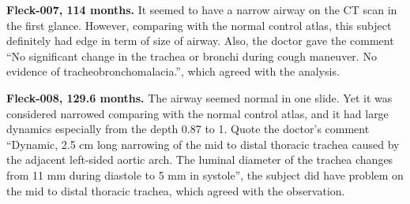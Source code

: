 {\bf Fleck-007, 114 months.}
It seemed to have a narrow airway on the CT scan in the first glance.
However, comparing with the normal control atlas, this subject definitely had edge in term of size of airway. 
Also, the doctor gave the comment ``No significant change in the trachea or bronchi during cough maneuver. No evidence of tracheobronchomalacia.'', which agreed with the analysis.

{\bf Fleck-008, 129.6 months.}
The airway seemed normal in one slide.
Yet it was considered narrowed comparing with the normal control atlas, and it had large dynamics especially from the depth 0.87 to 1.
Quote the doctor's comment ``Dynamic, 2.5 cm long narrowing of the mid to distal thoracic trachea caused by the adjacent left-sided aortic arch. The luminal diameter of the trachea changes from 11 mm during diastole to 5 mm in systole'', the subject did have problem on the mid to distal thoracic trachea, which agreed with the observation.


